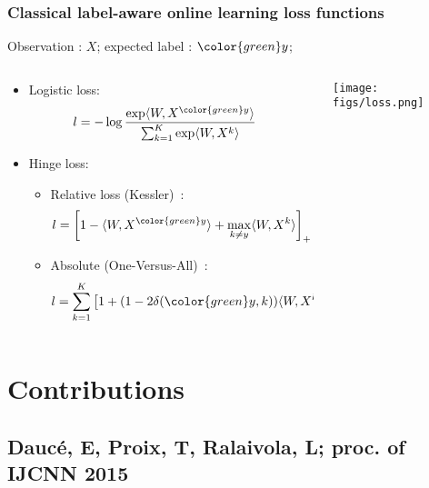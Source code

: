 \documentclass{beamer}
\begin{document}
\begin{frame}\frametitle{Classical label-aware online learning loss functions}
	Observation : $X$; expected label : ${\color{green}y}$; 
	\small
	\begin{columns}
		\begin{column}{.8\linewidth}
			\begin{footnotesize}
				\begin{itemize}
					\item Logistic loss:
					\begin{align*} 
					l &= - \log \frac{\exp \langle W, X^{\color{green}y} \rangle}{ \sum_{k=1}^K \exp\langle W, X^k\rangle}
					\end{align*}
					\item Hinge loss: 
					\begin{itemize}
						\item Relative loss (Kessler)~:
						$$l =  \left[ 1 -  \langle W, X^{\color{green}y} \rangle + \max_{k \neq y} \langle W, X^k\rangle\right]_+$$
						\item Absolute (One-Versus-All)~:
						$$l = \sum_{k=1}^K \left[1 + (1 - 2 \delta({\color{green}y},k)) \langle W, X^k\rangle\right]_+$$
					\end{itemize}
				\end{itemize}
			\end{footnotesize}			
		\end{column}
		\begin{column}{.2\linewidth}
			\centerline{\texttt{[image: figs/loss.png]}}
		\end{column}	
	\end{columns}
	\normalsize
	
\end{frame}


\section{Contributions}

\subsection{Daucé, E, Proix, T, Ralaivola, L; proc. of IJCNN 2015}
\begin{frame}
	\tableofcontents[currentsubsection]
\end{frame} 
\end{document}
